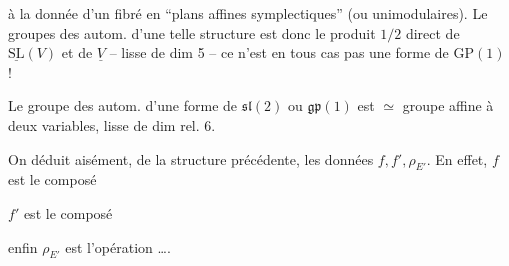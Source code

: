 à la donnée d'un fibré en ``plans affines symplectiques'' (ou unimodulaires). Le  groupes des autom. d'une telle structure est donc le produit $1/2$ direct de $\underline{\mathrm{SL}}(V)$ et de $\underline V$ -- lisse de dim 5 -- ce n'est en tous cas pas  une forme de $\mathrm{GP}(1)$ !

Le groupe des autom. d'une forme de $\mathfrak{sl}(2)$ ou $\mathfrak{gp}(1)$ est $\simeq$ groupe affine à deux variables, lisse de dim rel. 6.

On déduit aisément, de la structure précédente, les données $f,f',\rho_{E'}$. En effet, $f$ est le composé


$f'$ est le composé


enfin $\rho_{E'}$  est l'opération   \ldots.


